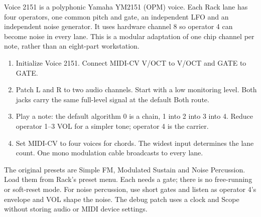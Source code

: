 Voice 2151 is a polyphonic Yamaha YM2151 (OPM) voice. Each Rack lane has
four operators, one common pitch and gate, an independent LFO and an
independent noise generator. It uses hardware channel 8 so operator 4 can
become noise in every lane. This is a modular adaptation of one chip
channel per note, rather than an eight-part workstation.

\begin{enumerate}
\item Initialize Voice 2151. Connect MIDI-CV V/OCT to V/OCT and GATE to GATE.
\item Patch L and R to two audio channels. Start with a low monitoring level.
Both jacks carry the same full-level signal at the default Both route.
\item Play a note: the default algorithm 0 is a chain, 1 into 2 into 3 into 4.
Reduce operator 1--3 VOL for a simpler tone; operator 4 is the carrier.
\item Set MIDI-CV to four voices for chords. The widest input determines the
lane count. One mono modulation cable broadcasts to every lane.
\end{enumerate}

The original presets are Simple FM, Modulated Sustain and Noise Percussion.
Load them from Rack's preset menu. Each needs a gate; there is no free-running
or soft-reset mode. For noise percussion, use short gates and listen as
operator 4's envelope and VOL shape the noise. The debug patch uses a clock
and Scope without storing audio or MIDI device settings.

